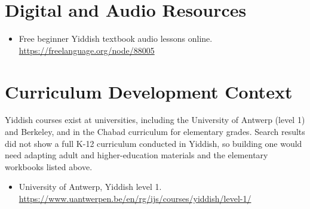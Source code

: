 \documentclass[12pt]{article}
\begin{document}
\section{Digital and Audio Resources}
\begin{itemize}
\item Free beginner Yiddish textbook audio lessons online. \url{https://freelanguage.org/node/88005}
\end{itemize}

\section{Curriculum Development Context}
Yiddish courses exist at universities, including the University of Antwerp (level 1) and Berkeley, and in the Chabad curriculum for elementary grades. Search results did not show a full K-12 curriculum conducted in Yiddish, so building one would need adapting adult and higher-education materials and the elementary workbooks listed above.
\begin{itemize}
\item University of Antwerp, Yiddish level 1. \url{https://www.uantwerpen.be/en/rg/ijs/courses/yiddish/level-1/}
\end{itemize}
\end{document}
